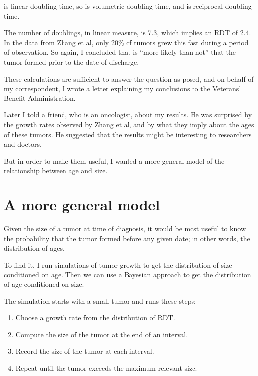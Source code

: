 \documentclass[12pt]{book}
\theoremstyle{exercise}
\begin{document}
 is linear doubling time, so  is volumetric
doubling time, and  is reciprocal doubling
time.

The number of doublings, in linear measure, is 7.3, which implies
an RDT of 2.4.  In the data from Zhang et al, only 20\% of tumors
grew this fast during a period of observation.  So again,
I concluded that is ``more likely than not'' that the tumor
formed prior to the date of discharge.

These calculations are sufficient to answer the question as
posed, and on behalf of my correspondent, I wrote a letter explaining
my conclusions to the Veterans' Benefit Administration.

Later I told a friend, who is an oncologist, about my results.  He was
surprised by the growth rates observed by Zhang et al, and by what
they imply about the ages of these tumors.  He suggested that the
results might be interesting to researchers and doctors.

But in order to make them useful, I wanted a more general model
of the relationship between age and size.


\section{A more general model}

Given the size of a tumor at time of diagnosis, it would be most
useful to know the probability that the tumor formed before
any given date; in other words, the distribution of ages.

To find it, I run simulations of tumor growth to get the
distribution of size conditioned on age.  Then we can use
a Bayesian approach to get the
distribution of age conditioned on size.

The simulation starts with a small tumor and runs these steps:

\begin{enumerate}

\item Choose a growth rate from the distribution of RDT.

\item Compute the size of the tumor at the end of an interval.

\item Record the size of the tumor at each interval.

\item Repeat until the tumor exceeds the maximum relevant size.

\end{enumerate}
\end{document}
